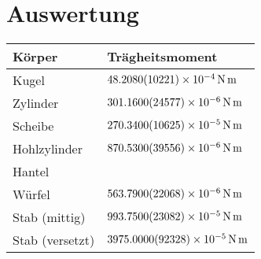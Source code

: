 \section{Auswertung}
\begin{tabular}{l|l}
Körper & Trägheitsmoment \\
\hline 
\hline 
Kugel & $\SI{48,208\pm 1,0221e-4}{\N\m}$ \\ 
\hline 
Zylinder & $\SI{301,16\pm 2,4577e-6}{\N\m}$ \\ 
\hline 
Scheibe & $\SI{270,34\pm 1,0625e-5}{\N\m}$ \\ 
\hline 
Hohlzylinder & $\SI{870,53 \pm 3,9556e-6}{\N\m}$ \\ 
\hline 
Hantel &  \\ 
\hline 
Würfel & $\SI{563,79 \pm 2,2068e-6}{\N\m}$ \\ 
\hline 
Stab (mittig) & $\SI{993,75\pm 2,3082e-5}{\N\m}$ \\ 
\hline 
Stab (versetzt) & $\SI{3975,0\pm 9,2328e-5}{\N\m}$ \\ 
\hline 
\end{tabular} 
